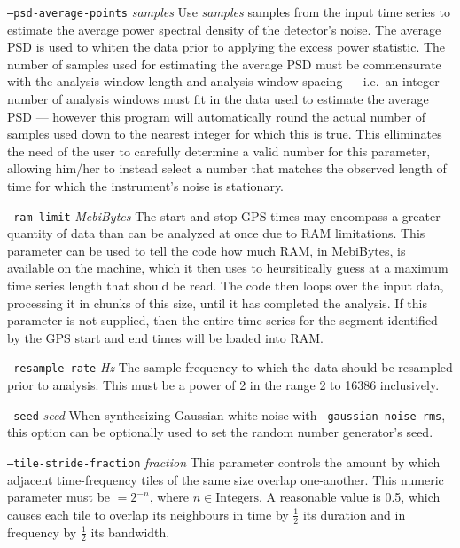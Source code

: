 \documentclass[10pt]{article}
\newcommand{\option}[1]{\texttt{#1}}
\newcommand{\parm}[1]{\textit{#1}}
\newenvironment{entry}%
{\begin{list}{}{\renewcommand{\makelabel}[1]%
{\parbox[b]{\labelwidth}{\makebox[0pt][l]{\textbf{##1}}\\}}%
\setlength{\labelwidth}{1em}%
\setlength{\labelsep}{1em}%
\setlength{\leftmargin}{2em}%
\setlength{\topsep}{\medskipamount}%
\setlength{\itemsep}{\medskipamount}%
\setlength{\parsep}{\medskipamount}%
\setlength{\listparindent}{0pt}}}
{\end{list}}
\begin{document}
\begin{entry}
\begin{entry}
\item[\option{--psd-average-points} \parm{samples}]
Use \parm{samples} samples from the input time series to estimate the
average power spectral density of the detector's noise.  The average PSD is
used to whiten the data prior to applying the excess power statistic.  The
number of samples used for estimating the average PSD must be commensurate
with the analysis window length and analysis window spacing --- i.e.\ an
integer number of analysis windows must fit in the data used to estimate
the average PSD --- however this program will automatically round the
actual number of samples used down to the nearest integer for which this is
true.  This elliminates the need of the user to carefully determine a valid
number for this parameter, allowing him/her to instead select a number that
matches the observed length of time for which the instrument's noise is
stationary.

\item[\option{--ram-limit} \parm{MebiBytes}]
The start and stop GPS times may encompass a greater quantity of data than
can be analyzed at once due to RAM limitations.  This parameter can be used
to tell the code how much RAM, in MebiBytes, is available on the machine,
which it then uses to heursitically guess at a maximum time series length
that should be read.  The code then loops over the input data, processing
it in chunks of this size, until it has completed the analysis.  If this
parameter is not supplied, then the entire time series for the segment
identified by the GPS start and end times will be loaded into RAM.

\item[\option{--resample-rate} \parm{Hz}]
The sample frequency to which the data should be resampled prior to
analysis.  This must be a power of 2 in the range \unit{2}{\hertz} to
\unit{16386}{\hertz} inclusively.

\item[\option{--seed} \parm{seed}]
When synthesizing Gaussian white noise with \option{--gaussian-noise-rms},
this option can be optionally used to set the random number generator's
seed.

\item[\option{--tile-stride-fraction} \parm{fraction}]
This parameter controls the amount by which adjacent time-frequency tiles
of the same size overlap one-another.  This numeric parameter must be \(=
2^{-n}\), where \(n \in \mathrm{Integers}\).  A reasonable value is 0.5,
which causes each tile to overlap its neighbours in time by \(\frac{1}{2}\)
its duration and in frequency by \(\frac{1}{2}\) its bandwidth.


\end{entry}
\end{entry}
\end{document}
